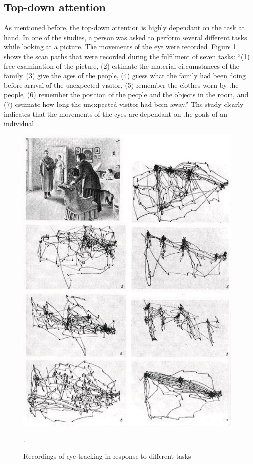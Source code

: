 \subsection{Top-down attention}\label{subsec:topdown_attention}
As mentioned before, the top-down attention is highly dependant on the task at hand. In one of the studies, a person was asked to perform several different tasks while looking at a picture. The movements of the eye were recorded. Figure \ref{fig:eye_movement_recording} shows the scan paths that were recorded during the fulfilment of seven tasks: “(1) free examination of the picture, (2) estimate the material circumstances of the family, (3) give the ages of the people, (4) guess what the family had been doing before arrival of the unexpected visitor, (5) remember the clothes worn by the people, (6) remember the position of the people and the objects in the room, and (7) estimate how long the unexpected visitor had been away.” The study clearly indicates that the movements of the eyes are dependant on the goals of an individual \cite{sundstedt2012gazing}. 

\begin{figure}[h!]
	\centering
	\includegraphics[width=\textwidth]{figures/eye_movement_recording.jpg}
	\caption{Recordings of eye tracking in response to different tasks \cite{sundstedt2012gazing}}.\label{fig:eye_movement_recording}
\end{figure}

